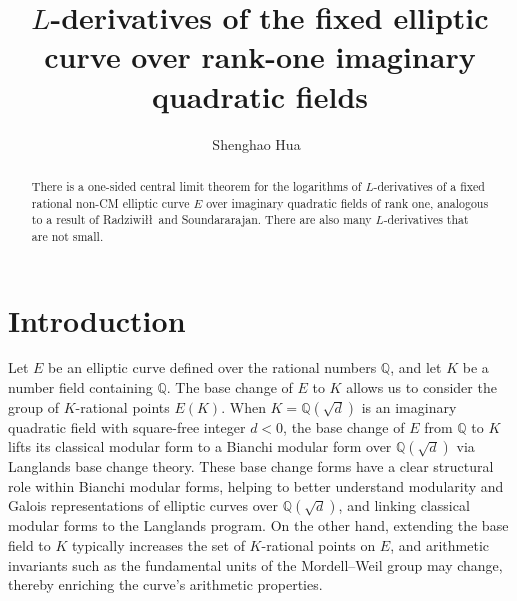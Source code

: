 \documentclass[12pt,reqno]{amsart}
\numberwithin{equation}{section}
\theoremstyle{plain}
\theoremstyle{definition}
\theoremstyle{remark}
\begin{document}
\title[$L$-derivatives]{$L$-derivatives of the fixed elliptic curve over rank-one imaginary quadratic fields}

\author{Shenghao Hua~}


\begin{abstract}
There is a one-sided central limit theorem for the logarithms of $L$-derivatives of a fixed rational non-CM elliptic curve $E$ over imaginary quadratic fields of rank one, analogous to a result of Radziwi\l\l\ and Soundararajan.
There are also many $L$-derivatives that are not small.
\end{abstract}



\maketitle


\section{Introduction} \label{sec:Intr}
Let \( E \) be an elliptic curve defined over the rational numbers \(\mathbb{Q}\), and let \( K \) be a number field containing \(\mathbb{Q}\). The base change of \( E \) to \( K \) allows us to consider the group of \( K \)-rational points \( E(K) \).
When \( K=\mathbb{Q}(\sqrt{d}) \) is an imaginary quadratic field with square-free integer $d<0$, the base change of $E$ from \(\mathbb{Q}\) to \( K \) lifts its classical modular form to a Bianchi modular form over \( \mathbb{Q}(\sqrt{d}) \) via Langlands base change theory. These base change forms have a clear structural role within Bianchi modular forms, helping to better understand modularity and Galois representations of elliptic curves over \( \mathbb{Q}(\sqrt{d}) \), and linking classical modular forms to the Langlands program.
On the other hand, extending the base field to \( K \) typically increases the set of \( K \)-rational points on $E$, and arithmetic invariants such as the fundamental units of the Mordell--Weil group may change, thereby enriching the curve's arithmetic properties.
\end{document}
